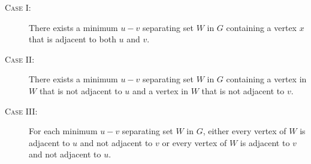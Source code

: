 \begin{frame}
  \begin{description}
    \item[\textsc{Case I}:] There exists a minimum $u-v$ separating set $W$ in $G$ 
      containing a vertex $x$ that is adjacent to both $u$ and $v$.
    \item[\textsc{Case II}:] There exists a minimum $u-v$ separating set $W$ in $G$
      containing a vertex in $W$ that is not adjacent to $u$ and a vertex in $W$ that is not adjacent to $v$.
    \item[\textsc{Case III}:] For each minimum $u-v$ separating set $W$ in $G$,
      either every vertex of $W$ is adjacent to $u$ and not adjacent to $v$
      or every vertex of $W$ is adjacent to $v$ and not adjacent to $u$.
  \end{description}
\end{frame}

